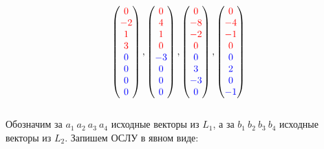 \documentclass[a4paper,11pt]{report}
\begin{document}
\[
\begin{pmatrix}
 \textcolor{red}{0}\\
 \textcolor{red}{-2}\\
 \textcolor{red}{1}\\
 \textcolor{red}{3}\\
 \textcolor{blue}{0}\\
 \textcolor{blue}{0}\\
 \textcolor{blue}{0}\\
 \textcolor{blue}{0}\\
\end{pmatrix},
\begin{pmatrix}
 \textcolor{red}{0}\\
 \textcolor{red}{4}\\
 \textcolor{red}{1}\\
 \textcolor{red}{0}\\
 \textcolor{blue}{-3}\\
 \textcolor{blue}{0}\\
 \textcolor{blue}{0}\\
 \textcolor{blue}{0}\\
\end{pmatrix},
\begin{pmatrix}
 \textcolor{red}{0}\\
 \textcolor{red}{-8}\\
 \textcolor{red}{-2}\\
 \textcolor{red}{0}\\
 \textcolor{blue}{0}\\
 \textcolor{blue}{3}\\
 \textcolor{blue}{-3}\\
 \textcolor{blue}{0}\\
\end{pmatrix},
\begin{pmatrix}
 \textcolor{red}{0}\\
 \textcolor{red}{-4}\\
 \textcolor{red}{-1}\\
 \textcolor{red}{0}\\
 \textcolor{blue}{0}\\
 \textcolor{blue}{2}\\
 \textcolor{blue}{0}\\
 \textcolor{blue}{-1}\\
\end{pmatrix}
\]\\ 
Обозначим за $a_1\ a_2\ a_3\ a_4$ исходные векторы из $L_1$, а за $b_1\ b_2\ b_3\ b_4$ исходные векторы из $L_2$. Запишем ОСЛУ в явном виде:
\end{document}
